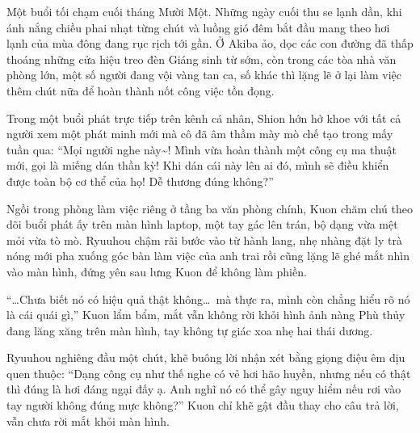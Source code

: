 \documentclass[../main.tex]{subfiles}
\begin{document}

Một buổi tối chạm cuối tháng Mười Một. Những ngày cuối thu se lạnh dần, khi ánh nắng chiều phai nhạt từng chút và luồng gió đêm bắt đầu mang theo hơi lạnh của mùa đông đang rục rịch tới gần. Ở Akiba ảo, dọc các con đường đã thấp thoáng những cửa hiệu treo đèn Giáng sinh từ sớm, còn trong các tòa nhà văn phòng lớn, một số người đang vội vàng tan ca, số khác thì lặng lẽ ở lại làm việc thêm chút nữa để hoàn thành nốt công việc tồn đọng.

Trong một buổi phát trực tiếp trên kênh cá nhân, Shion hớn hở khoe với tất cả người xem một phát minh mới mà cô đã âm thầm mày mò chế tạo trong mấy tuần qua: ``Mọi người nghe này\~{}! Mình vừa hoàn thành một công cụ ma thuật mới, gọi là miếng dán thần kỳ! Khi dán cái này lên ai đó, mình sẽ điều khiển được toàn bộ cơ thể của họ! Dễ thương đúng không?''


Ngồi trong phòng làm việc riêng ở tầng ba văn phòng chính, Kuon chăm chú theo dõi buổi phát ấy trên màn hình laptop, một tay gác lên trán, bộ dạng vừa mệt mỏi vừa tò mò. Ryuuhou chậm rãi bước vào từ hành lang, nhẹ nhàng đặt ly trà nóng mới pha xuống góc bàn làm việc của anh trai rồi cũng lặng lẽ ghé mắt nhìn vào màn hình, đứng yên sau lưng Kuon để không làm phiền.

``\dots Chưa biết nó có hiệu quả thật không\dots\ mà thực ra, mình còn chẳng hiểu rõ nó là cái quái gì,'' Kuon lẩm bẩm, mắt vẫn không rời khỏi hình ảnh nàng Phù thủy đang lăng xăng trên màn hình, tay không tự giác xoa nhẹ hai thái dương.

Ryuuhou nghiêng đầu một chút, khẽ buông lời nhận xét bằng giọng điệu êm dịu quen thuộc: ``Dạng công cụ như thế nghe có vẻ hơi hão huyền, nhưng nếu có thật thì đúng là hơi đáng ngại đấy ạ. Anh nghĩ nó có thể gây nguy hiểm nếu rơi vào tay người không đúng mực không?'' Kuon chỉ khẽ gật đầu thay cho câu trả lời, vẫn chưa rời mắt khỏi màn hình.
\end{document}
